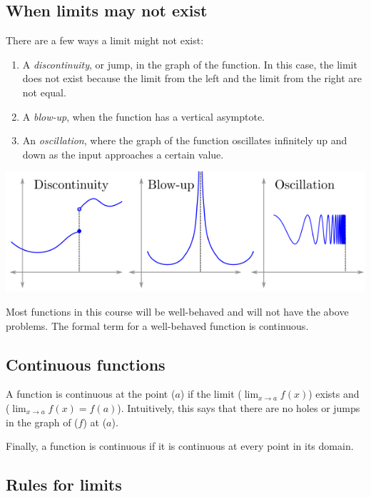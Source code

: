 \documentclass[twoside,openright,titlepage,a4paper]{book}
\begin{document}
\begin{sloppypar}
\subsection{When limits may not exist}

There are a few ways a limit might not exist:
\begin{enumerate}
	\item A \textit{discontinuity}, or jump, in the graph of the function. In this case, the limit does not exist because the limit from the left and the limit from the right are not equal.
	\item A \textit{blow-up}, when the function has a vertical asymptote.
	\item An \textit{oscillation}, where the graph of the function oscillates infinitely up and down as the input approaches a certain value.
\end{enumerate}
\begin{center}\includegraphics[scale=0.6]{LimitFails}\end{center}

Most functions in this course will be well-behaved and will not have the above problems. The formal term for a well-behaved function is continuous.

\subsection{Continuous functions}

A function is continuous at the point ($a$) if the limit ($\lim_{x \rightarrow a} f(x)$) exists and ($\lim_{x \rightarrow a} f(x) = f(a)$). Intuitively, this says that there are no holes or jumps in the graph of ($f$) at ($a$).

Finally, a function is continuous if it is continuous at every point in its domain.

\subsection{Rules for limits} \label{ChFunctionsSecLimitsSubsecRulesForLimits}


\end{sloppypar}
\end{document}
